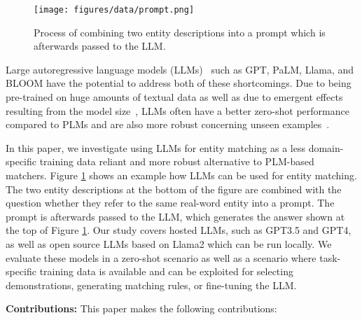 \documentclass[sigconf,nonacm]{acmart}
\begin{document}
\begin{figure}[h]
  \centering
  \texttt{[image: figures/data/prompt.png]}
  \caption{Process of combining two entity descriptions into a prompt which is afterwards passed to the LLM.}
  \label{fig:prompt}
\end{figure} 
Large autoregressive language models (LLMs)~\cite{zhao2023survey} such as GPT, PaLM, Llama, and BLOOM have the potential to address both of these shortcomings. Due to being pre-trained on huge amounts of textual data as well as due to emergent effects resulting from the model size~\cite{wei2022emergent}, LLMs often have a better zero-shot performance compared to PLMs and are also more robust concerning unseen examples~\cite{brown2020language}. 

In this paper, we investigate using LLMs for entity matching as a less domain-specific training data reliant and more robust alternative to PLM-based matchers. Figure \ref{fig:prompt} shows an example how LLMs can be used for entity matching. The two entity descriptions at the bottom of the figure are combined with the question whether they refer to the same real-word entity into a prompt. The prompt is afterwards passed to the LLM, which generates the answer shown at the top of Figure \ref{fig:prompt}. 
Our study covers hosted LLMs, such as GPT3.5 and GPT4,
as well as open source LLMs based on Llama2 which can be run
locally. We evaluate these models in a zero-shot scenario as well as a
scenario where task-specific training data is available and can be exploited for selecting demonstrations, generating matching rules, or fine-tuning the LLM. 

\textbf{Contributions:} This paper makes the following contributions:
\end{document}
